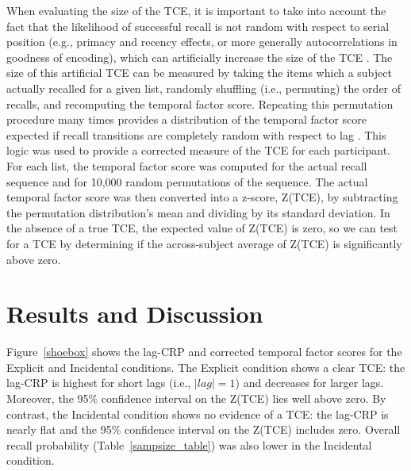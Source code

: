 \documentclass[jou,natbib,floatsintext]{apa6} %
\begin{document}
When evaluating the size of the TCE, it is important to take into account the fact that the likelihood of successful recall is not random with respect to serial position (e.g., primacy and recency effects, or more generally autocorrelations in goodness of encoding), which can artificially increase the size of the TCE \citep{HealKaha17,Hint16}. The size of this artificial TCE can be measured by taking the items which a subject actually recalled for a given list, randomly shuffling (i.e., permuting) the order of recalls, and recomputing the temporal factor score. Repeating this permutation procedure many times provides a distribution of the temporal factor score expected if recall transitions are completely random with respect to lag \citep{HealKaha17}. This logic was used to provide a corrected measure of the TCE for each participant. For each list, the temporal factor score was computed for the actual recall sequence and for 10,000 random permutations of the sequence. The actual temporal factor score was then converted into a z-score, Z(TCE), by subtracting the permutation distribution's mean and dividing by its standard deviation. In the absence of a true TCE, the expected value of Z(TCE) is zero, so we can test for a TCE by determining if the across-subject average of Z(TCE) is significantly above zero.   


\section{Results and Discussion}

Figure~\ref{shoebox} shows the lag-CRP and corrected temporal factor scores for the Explicit and Incidental conditions. The Explicit condition shows a clear TCE: the lag-CRP is highest for short lags (i.e., $|lag|=1$) and decreases for larger lags. Moreover, the 95\% confidence interval on the Z(TCE) lies well above zero. By contrast, the Incidental condition shows no evidence of a TCE: the lag-CRP is nearly flat and the 95\% confidence interval on the Z(TCE) includes zero. Overall recall probability (Table~\ref{sampsize_table}) was also lower in the Incidental condition.
\end{document}
